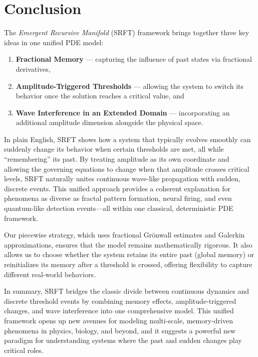 \documentclass[12pt]{article}
\begin{document}
\section{Conclusion}
\label{sec:conclusion}

The \emph{Emergent Recursive Manifold} (SRFT) framework brings together three key ideas in one unified PDE model: 
\begin{enumerate}
  \item \textbf{Fractional Memory} — capturing the influence of past states via fractional derivatives, 
  \item \textbf{Amplitude-Triggered Thresholds} — allowing the system to switch its behavior once the solution reaches a critical value, and 
  \item \textbf{Wave Interference in an Extended Domain} — incorporating an additional amplitude dimension alongside the physical space.
\end{enumerate}

In plain English, SRFT shows how a system that typically evolves smoothly can suddenly change its behavior when certain thresholds are met, all while “remembering” its past. By treating amplitude as its own coordinate and allowing the governing equations to change when that amplitude crosses critical levels, SRFT naturally unites continuous wave-like propagation with sudden, discrete events. This unified approach provides a coherent explanation for phenomena as diverse as fractal pattern formation, neural firing, and even quantum-like detection events—all within one classical, deterministic PDE framework.

Our piecewise strategy, which uses fractional Grönwall estimates and Galerkin approximations, ensures that the model remains mathematically rigorous. It also allows us to choose whether the system retains its entire past (global memory) or reinitializes its memory after a threshold is crossed, offering flexibility to capture different real-world behaviors.

In summary, SRFT bridges the classic divide between continuous dynamics and discrete threshold events by combining memory effects, amplitude-triggered changes, and wave interference into one comprehensive model. This unified framework opens up new avenues for modeling multi-scale, memory-driven phenomena in physics, biology, and beyond, and it suggests a powerful new paradigm for understanding systems where the past and sudden changes play critical roles.



%
%
\end{document}
